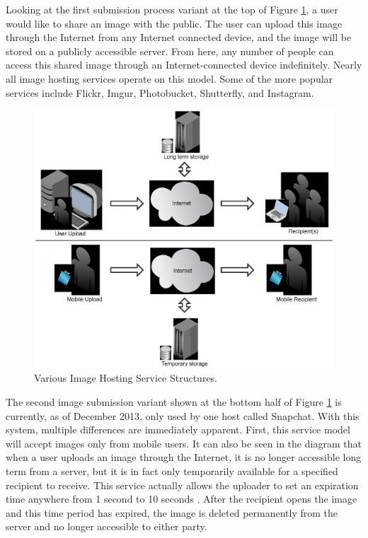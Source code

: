 Looking at the first submission process variant at the top of Figure \ref{imageshareprocess}, a user would like to share an image with the public. The user can upload this image through the Internet from any Internet connected device, and the image will be stored on a publicly accessible server. From here, any number of people can access this shared image through an Internet-connected device indefinitely. Nearly all image hosting services operate on this model. Some of the more popular services include Flickr, Imgur, Photobucket, Shutterfly, and Instagram.

\begin{figure}[htbp]
\centering
\includegraphics[width=4.5in]{imageshareprocess}
\caption{Various Image Hosting Service Structures.}
\label{imageshareprocess}
\end{figure}

The second image submission variant shown at the bottom half of Figure \ref{imageshareprocess} is currently, as of December 2013, only used by one host called Snapchat. With this system, multiple differences are immediately apparent. First, this service model will accept images only from mobile users. It can also be seen in the diagram that when a user uploads an image through the Internet, it is no longer accessible long term from a server, but it is in fact only temporarily available for a specified recipient to receive. This service actually allows the uploader to set an expiration time anywhere from 1 second to 10 seconds \cite{snap:support}. After the recipient opens the image and this time period has expired, the image is deleted permanently from the server and no longer accessible to either party.

